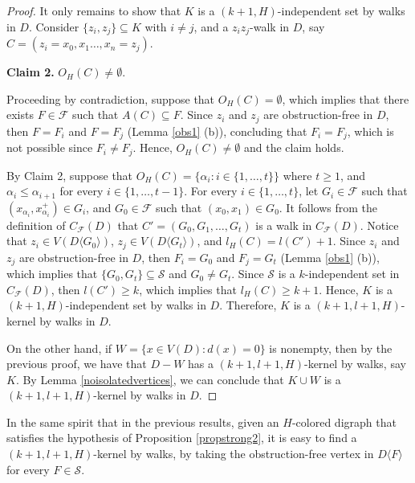 \documentclass[10pt,a4paper]{article}
\begin{document}
\begin{proof}
 It only remains to show that $K$ is a $(k+1, H)$-independent set by walks in $D$. Consider $\{ z_{i}, z_{j} \} \subseteq K$ with $i \neq j$, and a  $z_{i}z_{j}$-walk in $D$, say $C=(z_{i}=x_{0}, x_{1} \ldots , x_{n} = z_{j})$. 

\begin{description}
\item \textbf{Claim 2.} $O_{H}(C) \neq \emptyset$.

Proceeding by contradiction, suppose that $O_{H}(C) = \emptyset$, which implies that there exists $F \in \mathscr{F}$ such that $A(C)\subseteq F$. Since $z_{i}$ and $z_{j}$ are obstruction-free in $D$, then $F = F_{i}$ and $F = F_{j}$ (Lemma \ref{obs1} (b)), concluding that $F_{i}=F_{j}$, which is not possible since $F_{i} \neq F_{j}$. Hence, $O_{H}(C) \neq \emptyset$ and the claim holds.
\end{description}

By Claim 2, suppose that $O_{H}(C)=\{ \alpha_{i} : i \in \{1, \ldots , t \} \}$ where $t \geq 1$, and $\alpha_{i} \leq \alpha_{i+1}$ for every $ i \in \{ 1, \ldots , t-1 \}$. For every $i \in \{ 1, \ldots , t \}$, let $G_{i} \in \mathscr{F}$ such that $(x_{\alpha_{i}}, x_{\alpha_{i}}^{+} ) \in G_{i}$, and $G_{0} \in \mathscr{F}$ such that $(x_{0}, x_{1}) \in G_{0}$.
 It follows from the definition of $C_{\mathscr{F}}(D)$ that $C'=(G_{0}, G_{1}, \ldots , G_{t})$ is a walk in $C_{\mathscr{F}}(D)$. Notice that $z_{i} \in V(D\langle G_{0} \rangle )$, $z_{j} \in V(D\langle G_{t} \rangle )$, and $l_{H}(C)= l(C') +1$. Since $z_{i}$ and $z_{j}$ are obstruction-free in $D$, then $F_{i} =G_{0}$ and $F_{j} = G_{t}$ (Lemma \ref{obs1} (b)), which implies that $\{ G_{0}, G_{t} \} \subseteq \mathcal{S}$ and $G_{0} \neq G_{t}$. Since $\mathcal{S}$ is a $k$-independent set in $C_{\mathscr{F}}(D)$, then $l(C') \geq k $, which implies that $ l_{H}(C) \geq k+1$. Hence, $K$ is a $(k+1, H)$-independent set by walks in $D$. Therefore, $K$ is a $(k+1, l+1, H)$-kernel by walks in $D$.

On the other hand, if $W=\{x\in V(D) : d(x) =0\}$ is nonempty, then by the previous proof, we have that $D - W$ has a $(k+1,l +1 ,H)$-kernel by walks, say $K$. By Lemma \ref{noisolatedvertices}, we can conclude that $K \cup W$ is a  $(k+1,l+1, H)$-kernel by walks in $D$.
\end{proof}

In the same spirit that in the previous results, given an $H$-colored digraph that satisfies the hypothesis of Proposition \ref{propstrong2}, it is easy to find a $(k+1, l+1,H)$-kernel by walks, by taking the obstruction-free vertex in $D\langle F \rangle$ for every $F \in \mathcal{S}$.
\end{document}
